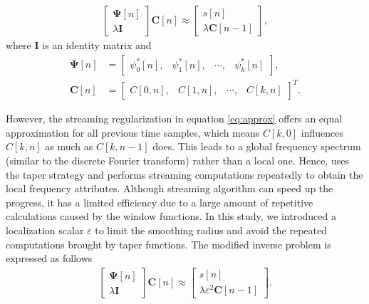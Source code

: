 \begin{eqnarray}
	\label{eq:block}
	\left[
	\begin{array}{c}
		\mathbf{\Psi}[n]\\
		\lambda {\mathbf{I}}
	\end{array}
	\right]
	\mathbf{C}[n]
	\approx
	\left[
	\begin{array}{c}
		s[n]\\
		\lambda \mathbf{C}[n-1]
	\end{array}
	\right],
\end{eqnarray}
\noindent where $\mathbf{I}$ is an identity matrix and
\begin{equation}
	\begin{aligned}
		\label{eq:def}
		\mathbf{\Psi}[n]&=
		\left[
		\begin{array}{cccc}
			\psi^{*}_0[n], & \psi^{*}_1[n], & \cdots, & \psi^{*}_k[n]
		\end{array}
		\right], \\
		\mathbf{C}[n]&=
		\left[
		\begin{array}{cccc}
			C[0,n],&C[1,n],& \cdots, & C[k,n]
		\end{array}
		\right]^T.
	\end{aligned}
\end{equation}

However, the streaming regularization in equation \ref{eq:approx}
offers an equal approximation for all previous time samples, which
means $C[k,0]$ influences $C[k,n]$ as much as $C[k,n-1]$ does. This
leads to a global frequency spectrum (similar to the discrete Fourier
transform) rather than a local one. Hence, \cite{Geng24} uses the
taper strategy and performs streaming computations repeatedly to
obtain the local frequency attributes. Although streaming algorithm
can speed up the progress, it has a limited efficiency due to a large
amount of repetitive calculations caused by the window functions. In
this study, we introduced a localization scalar $\varepsilon$ to limit
the smoothing radius and avoid the repeated computations brought by
taper functions. The modified inverse problem is expressed as follows
\begin{eqnarray}
	\label{eq:block1}
	\left[
	\begin{array}{c}
		\mathbf{\Psi}[n]\\
		\lambda {\mathbf{I}}
	\end{array}
	\right]
	\mathbf{C}[n]
	\approx
	\left[
	\begin{array}{c}
		s[n]\\
		\lambda\varepsilon^2\mathbf{C}[n-1]
	\end{array}
	\right].
\end{eqnarray}

